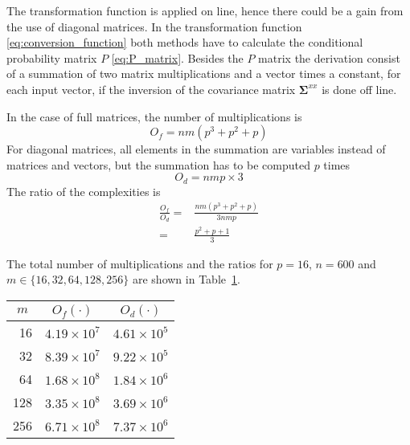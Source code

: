 The transformation function is applied on line, hence there could be a gain from the use of diagonal matrices. In the transformation function \eqref{eq:conversion_function} both methods have to calculate the conditional probability matrix $P$ \eqref{eq:P_matrix}. Besides the $P$ matrix the derivation consist of a summation of two matrix multiplications and a vector times a constant, for each input vector, if the inversion of the covariance matrix $\mathbf{\Sigma}^{xx}$ is done off line. 

In the case of full matrices, the number of multiplications is
\begin{equation}
	O_f = nm(p^3 + p^2+p)
\end{equation}
For diagonal matrices, all elements in the summation are variables instead of matrices and vectors, but the summation has to be computed $p$ times
\begin{equation}
	O_d = nmp\times3
\end{equation}
The ratio of the complexities is
\begin{equation}
	\begin{split}
		\frac{O_f}{O_d} = & \frac{nm(p^3 + p^2+p)}{3nmp} \\
		= & \frac{p^2 + p+1}{3}
	\end{split}
\end{equation}

The total number of multiplications and the ratios for $p=16$, $n=600$ and $m\in \{16,32,64,128,256\}$ are shown in Table~\ref{tab:derivation_complexity}.
\begin{table}[ht]
	\begin{center}
		\begin{tabular}{rll}
			\toprule
			\multicolumn{1}{c}{$m$} & \multicolumn{1}{c}{$O_f(\cdot)$} & \multicolumn{1}{c}{$O_d(\cdot)$} \\
			\midrule
			16 & $4.19 \times 10^7$ & $4.61 \times 10^5$ \\
			32 & $8.39 \times 10^7$ & $9.22 \times 10^5$ \\
			64 & $1.68 \times 10^8$ & $1.84 \times 10^6$ \\
			128 & $3.35 \times 10^8$ & $3.69 \times 10^6$ \\
			256 & $6.71 \times 10^8$ & $7.37 \times 10^6$ \\
			\bottomrule			
		\end{tabular}		
	\end{center}
\label{tab:derivation_complexity}	
\end{table}

